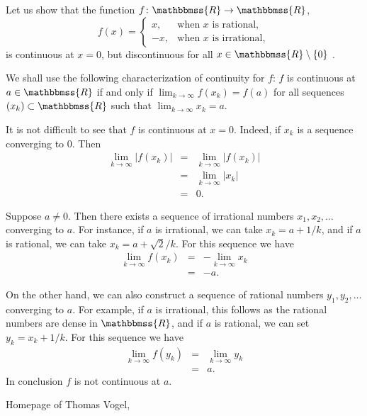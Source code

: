 \documentclass[12pt]{article}
\newcommand{\R}{\mathbbmss{R}}
\begin{document}
Let us show that the function $f\colon \R\to\R$, 
$$
  f(x) = \begin{cases} x, & \mbox{when $x$ is rational}, \\
                     -x, & \mbox{when $x$ is irrational}, 
   	\end{cases}
$$
is continuous at $x=0$, but discontinuous for all $x\in \R\setminus\{0\}$ 
\cite{tv}.


We shall use the following characterization of continuity for $f$:
$f$ is continuous at $a\in \R$ if and only if $\lim_{k\to \infty} f(x_k)=f(a)$
for all sequences $(x_k)\subset \R$ such that $\lim_{k\to \infty} x_k=a$.

It is not difficult to see that $f$ is continuous at $x=0$. Indeed, if $x_k$ is a
sequence converging to $0$. Then 
\begin{eqnarray*}
  \lim_{k\to \infty} |f(x_k)| &=&   \lim_{k\to \infty} |f(x_k)| \\
			&=&   \lim_{k\to \infty} |x_k| \\
			&=&   0.
\end{eqnarray*}

Suppose $a\neq 0$. Then there exists a sequence of irrational numbers $x_1, x_2, \ldots$
converging to $a$. For instance, if $a$ is irrational, we can take $x_k = a+1/k$, and 
if $a$ is rational, we can take $x_k = a+\sqrt{2}/k$. For this sequence we have 
\begin{eqnarray*}
  \lim_{k\to \infty} f(x_k) &=& -\lim_{k\to \infty} x_k \\
			 &=& -a.
\end{eqnarray*}

On the other hand, we can also construct a sequence of rational numbers $y_1,y_2,\ldots$ 
converging to $a$. For example, if $a$ is irrational, this follows as the rational numbers
are dense in $\R$, and if $a$ is rational, we can set $y_k = x_k+ 1/k$. 
For this sequence we have 
\begin{eqnarray*}
  \lim_{k\to \infty} f(y_k) &=& \lim_{k\to \infty} y_k \\
			 &=& a.
\end{eqnarray*}
In conclusion $f$ is not continuous at $a$. 


\begin{thebibliography}{9}
 Homepage of Thomas Vogel,
\end{thebibliography}
\end{document}
